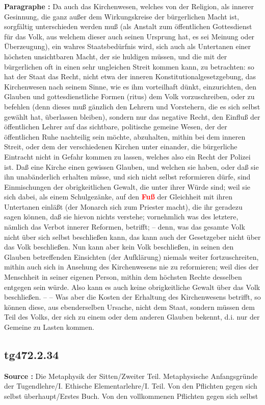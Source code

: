 \documentclass[a4paper,12pt,twoside]{book}
\newcommand{\match}[1]{\textcolor{red}{\textbf{#1}}}
\begin{document}
	\textbf{Paragraphe : }Da auch das Kirchenwesen, welches von der Religion, als innerer Gesinnung, die ganz außer dem Wirkungskreise der bürgerlichen Macht ist, sorgfältig unterschieden werden muß (als Anstalt zum öffentlichen Gottesdienst für das Volk, aus welchem dieser auch seinen Ursprung hat, es sei Meinung oder Überzeugung), ein wahres Staatsbedürfnis  wird, sich auch als Untertanen einer höchsten unsichtbaren Macht, der sie huldigen müssen, und die mit der bürgerlichen oft in einen sehr ungleichen Streit kommen kann, zu betrachten: so hat der Staat das Recht, nicht etwa der inneren Konstitutionalgesetzgebung, das Kirchenwesen nach seinem Sinne, wie es ihm vorteilhaft dünkt, einzurichten, den Glauben und gottesdienstliche Formen (ritus) dem Volk vorzuschreiben, oder zu befehlen (denn dieses muß gänzlich den Lehrern und Vorstehern, die es sich selbst gewählt hat, überlassen bleiben), sondern nur das negative Recht, den Einfluß der öffentlichen Lehrer auf das sichtbare, politische gemeine Wesen, der der öffentlichen Ruhe nachteilig sein möchte, abzuhalten, mithin bei dem inneren Streit, oder dem der verschiedenen Kirchen unter einander, die bürgerliche Eintracht nicht in Gefahr kommen zu lassen, welches also ein Recht der Polizei ist. Daß eine Kirche einen gewissen Glauben, und welchen sie haben, oder daß sie ihn unabänderlich erhalten müsse, und sich nicht selbst reformieren dürfe, sind Einmischungen der obrigkeitlichen Gewalt, die unter ihrer Würde sind; weil sie sich dabei, als einem Schulgezänke, auf den \match{Fuß} der Gleichheit mit ihren Untertanen einläßt (der Monarch sich zum Priester macht), die ihr geradezu sagen können, daß sie hievon nichts verstehe; vornehmlich was des letztere, nämlich das Verbot innerer Reformen, betrifft; – denn, was das gesamte Volk nicht über sich selbst beschließen kann, das kann auch der Gesetzgeber nicht über das Volk beschließen. Nun kann aber kein Volk beschließen, in seinen den Glauben betreffenden Einsichten (der Aufklärung) niemals weiter fortzuschreiten, mithin auch sich in Ansehung des Kirchenwesens nie zu reformieren; weil dies der Menschheit in seiner eigenen Person, mithin dem höchsten Rechte desselben entgegen sein würde. Also kann es auch keine obrigkeitliche Gewalt über das Volk beschließen. – – Was aber die Kosten der Erhaltung des Kirchenwesens betrifft, so können diese, aus ebenderselben Ursache, nicht dem Staat, sondern müssen dem Teil des Volks, der sich zu einem oder dem anderen Glauben bekennt, d.i. nur der Gemeine zu Lasten kommen. 
	
	\subsection*{tg472.2.34} 
	\textbf{Source : }Die Metaphysik der Sitten/Zweiter Teil. Metaphysische Anfangsgründe der Tugendlehre/I. Ethische Elementarlehre/I. Teil. Von den Pflichten gegen sich selbst überhaupt/Erstes Buch. Von den vollkommenen Pflichten gegen sich selbst\\  
	
\end{document}
